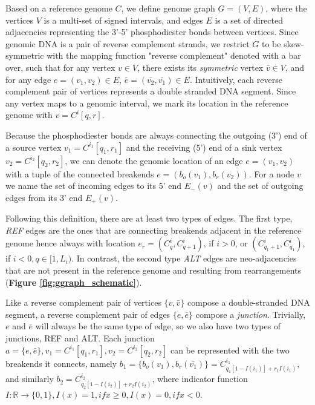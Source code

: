 \documentclass[phd,tocprelim]{cornell}
\begin{document}
Based on a reference genome $C$, we define genome graph $G = (V, E)$, where the vertices $V$ is a multi-set of signed intervals, and edges $E$ is a set of directed adjacencies representing the 3'-5' phosphodiester bonds between vertices. Since genomic DNA is a pair of reverse complement strands, we restrict $G$ to be skew-symmetric \cite{Goldberg1996-qm} with the mapping function "reverse complement" denoted with a bar over, such that for any vertex $v \in V$, there exists its \textit{symmetric} vertex $\bar{v} \in V$, and for any edge $e = (v_1, v_2) \in E$, $\bar{e} = (\bar{v_2}, \bar{v_1}) \in E$. Intuitively, each reverse complement pair of vertices represents a double stranded DNA segment. Since any vertex maps to a genomic interval, we mark its location in the reference genome with $v = C^{i}[q,r]$.

Because the phosphodiester bonds are always connecting the outgoing (3') end of a source vertex $v_1 = C^{i_1}[q_1,r_1]$ and the receiving (5') end of a sink vertex $v_2 = C^{i_2}[q_2,r_2]$, we can denote the genomic location of an edge $e = (v_1, v_2)$ with a tuple of the connected breakends $e = (b_o(v_1), b_r(v_2))$. For a node $v$ we name the set of incoming edges to its 5' end $E_{-}(v)$ and the set of outgoing edges from its 3' end $E_{+}(v)$.

Following this definition, there are at least two types of edges. The first type, \textit{REF} edges are the ones that are connecting breakends adjacent in the reference genome hence always with location $e_r = (C^{i}_{q}, C^{i}_{q + 1})$, if $i>0$, or $(C^{i}_{q_1 + 1}, C^{i}_{q_1})$, if $i<0, q \in [1,L_i)$. In contrast, the second type \textit{ALT} edges are neo-adjacencies that are not present in the reference genome and resulting from rearrangements (\textbf{Figure \ref{fig:ggraph_schematic}}).

Like a reverse complement pair of vertices $\{v, \bar{v}\}$ compose a double-stranded DNA segment, a reverse complement pair of edges $\{e, \bar{e}\}$ compose a \textit{junction}. Trivially, $e$ and $\bar{e}$ will always be the same type of edge, so we also have two types of junctions, REF and ALT. Each junction $a = \{e, \bar{e}\}, v_1 = C^{i_1}[q_1,r_1], v_2 = C^{i_2}[q_2,r_2]$ can be represented with the two breakends it connects, namely $b_1 = \{b_o(v_1), b_r(\bar{v_1})\} = C^{i_1}_{q_1 [1-I(i_1)] + r_1 I(i_1)}$, and similarly $b_2 = C^{i_2}_{q_2 [1-I(i_2)] + r_2 I(i_2)}$, where indicator function $I:\mathbb{R}\rightarrow \{0, 1\}, I(x)=1, if x \ge 0, I(x) = 0, if x<0$.
\end{document}
